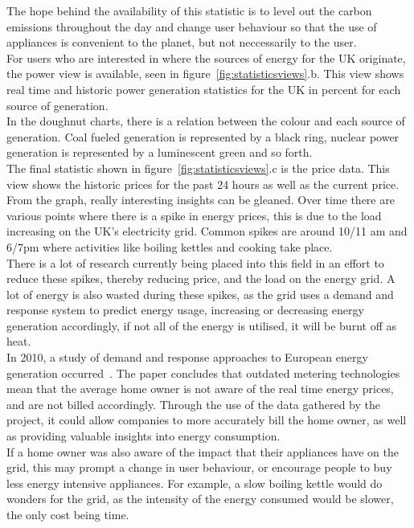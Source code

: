 \documentclass[preprint,12pt,3p]{elsarticle}
\begin{document}
The hope behind the availability of this statistic is to level out the carbon emissions throughout the day and change user behaviour so that the use of appliances is convenient to the planet, but not neccessarily to the user.\\
For users who are interested in where the sources of energy for the UK originate, the power view is available, seen in figure~\ref{fig:statisticsviews}.b. This view shows real time and historic power generation statistics for the UK in percent for each source of generation.\\
In the doughnut charts, there is a relation between the colour and each source of generation. Coal fueled generation is represented by a black ring, nuclear power generation is represented by a luminescent green and so forth.\\
The final statistic shown in figure~\ref{fig:statisticsviews}.c is the price data. This view shows the historic prices for the past 24 hours as well as the current price.\\
From the graph, really interesting insights can be gleaned. Over time there are various points where there is a spike in energy prices, this is due to the load increasing on the UK's electricity grid. Common spikes are around 10/11 am and 6/7pm where activities like boiling kettles and cooking take place.\\
There is a lot of research currently being placed into this field in an effort to reduce these spikes, thereby reducing price, and the load on the energy grid. A lot of energy is also wasted during these spikes, as the grid uses a demand and response system to predict energy usage, increasing or decreasing energy generation accordingly, if not all of the energy is utilised, it will be burnt off as heat.\\
In 2010, a study of demand and response approaches to European energy generation occurred~\cite{demandresponse}. The paper concludes that outdated metering technologies mean that the average home owner  is not aware of the real time energy prices, and are not billed accordingly. Through the use of the data gathered by the project, it could allow companies to more accurately bill the home owner, as well as providing valuable insights into energy consumption.\\
If a home owner was also aware of the impact that their appliances have on the grid, this may prompt a change in user behaviour, or encourage people to buy less energy intensive appliances. For example, a slow boiling kettle would do wonders for the grid, as the intensity of the energy consumed would be slower, the only cost being time.
\end{document}
